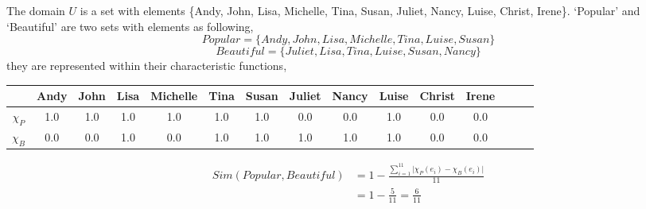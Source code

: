\begin{ex}
The domain $U$ is a set with elements \{Andy, John, Lisa, Michelle, Tina, Susan, Juliet, Nancy, Luise, Christ, Irene\}. 
`Popular' and `Beautiful' are two sets with elements as following,
\[Popular = \{Andy, John, Lisa, Michelle, Tina, Luise, Susan\}\]
\[Beautiful = \{Juliet, Lisa, Tina, Luise, Susan, Nancy\}\] 
they are represented within their characteristic functions,
\begin{center}
\begin{tabular}{|c||c|c|c|c|c|c|c|c|c|c|c|c|c|c|}
\hline
 & Andy & John & Lisa & Michelle & Tina & Susan & Juliet & Nancy & Luise & Christ & Irene \\
\hline
$\chi_{P}$ & 1.0 & 1.0 & 1.0 & 1.0 & 1.0 & 1.0 & 0.0 & 0.0 & 1.0 & 0.0 & 0.0 \\
\hline 
$\chi_{B}$ & 0.0 & 0.0 & 1.0 & 0.0 & 1.0 & 1.0 & 1.0 & 1.0 & 1.0 & 0.0 & 0.0 \\
\hline
\end{tabular}
\end{center}
\begin{align*}
Sim(Popular,Beautiful) & = 1- \frac{\sum_{i=1}^{11} \lvert \chi_{P}(e_i) - \chi_{B}(e_i) \rvert}{11}\\
	        & = 1- \frac{5}{11} = \frac{6}{11}\\
\end{align*}
\end{ex}
